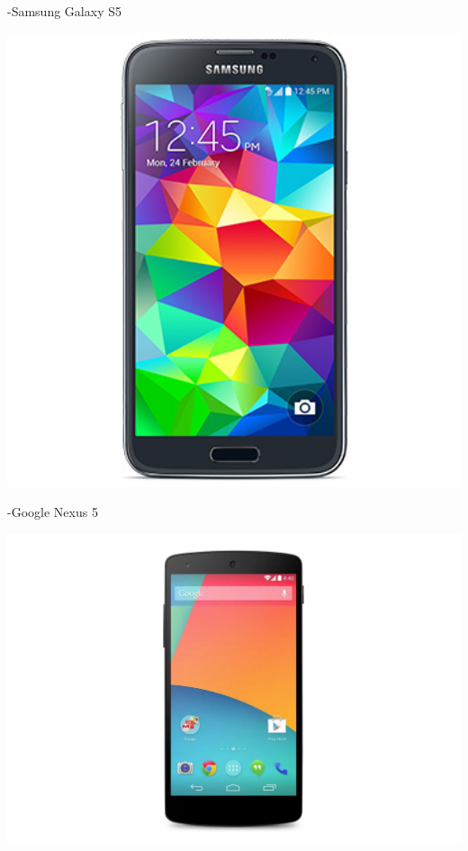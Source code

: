 -Samsung Galaxy S5

\begin{center}
\includegraphics[width=1\textwidth]{imgs/s5.jpg}
\label{s5_img}%
\end{center}
\newpage

-Google Nexus 5

\begin{center}
\includegraphics[width=1\textwidth]{imgs/nexus5.jpg}
\label{nexus_5_img}%
\end{center}
\newpage

